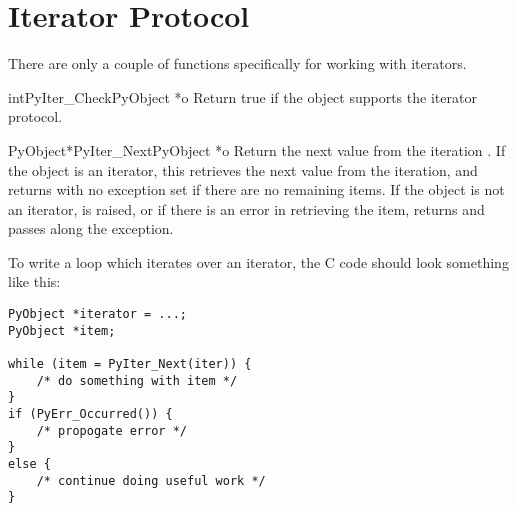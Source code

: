 \section{Iterator Protocol \label{iterator}}


There are only a couple of functions specifically for working with
iterators.

\begin{cfuncdesc}{int}{PyIter_Check}{PyObject *o}
  Return true if the object  supports the iterator protocol.
\end{cfuncdesc}

\begin{cfuncdesc}{PyObject*}{PyIter_Next}{PyObject *o}
  Return the next value from the iteration .  If the object is
  an iterator, this retrieves the next value from the iteration, and
  returns \NULL{} with no exception set if there are no remaining
  items.  If the object is not an iterator,  is
  raised, or if there is an error in retrieving the item, returns
  \NULL{} and passes along the exception.
\end{cfuncdesc}

To write a loop which iterates over an iterator, the C code should
look something like this:

\begin{verbatim}
PyObject *iterator = ...;
PyObject *item;

while (item = PyIter_Next(iter)) {
    /* do something with item */
}
if (PyErr_Occurred()) {
    /* propogate error */
}
else {
    /* continue doing useful work */
}
\end{verbatim}
